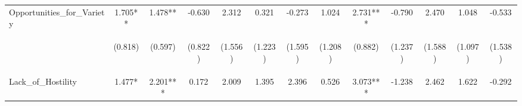 \begin{tabular}{lcccccccccccc}
\noalign{\smallskip}Opportunities_for_Variety & 1.705** & 1.478** & -0.630 & 2.312 & 0.321 & -0.273 & 1.024 & 2.731*** & -0.790 & 2.470 & 1.048 & -0.533\\
 & \begin{footnotesize}(0.818)\end{footnotesize} & \begin{footnotesize}(0.597)\end{footnotesize} & \begin{footnotesize}(0.822)\end{footnotesize} & \begin{footnotesize}(1.556)\end{footnotesize} & \begin{footnotesize}(1.223)\end{footnotesize} & \begin{footnotesize}(1.595)\end{footnotesize} & \begin{footnotesize}(1.208)\end{footnotesize} & \begin{footnotesize}(0.882)\end{footnotesize} & \begin{footnotesize}(1.237)\end{footnotesize} & \begin{footnotesize}(1.588)\end{footnotesize} & \begin{footnotesize}(1.097)\end{footnotesize} & \begin{footnotesize}(1.538)\end{footnotesize}\\
\noalign{\smallskip}Lack_of_Hostility & 1.477* & 2.201*** & 0.172 & 2.009 & 1.395 & 2.396 & 0.526 & 3.073*** & -1.238 & 2.462 & 1.622 & -0.292\\

\end{tabular}
